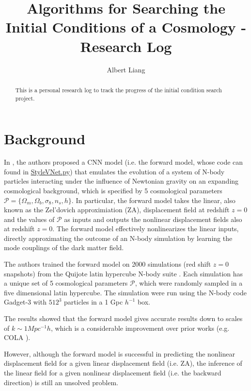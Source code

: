\documentclass{article}
\title{Algorithms for Searching the Initial Conditions of a Cosmology - Research Log}
\author{%
  Albert Liang
}
\begin{document}
\maketitle


\begin{abstract}
    This is a personal research log to track the progress of the initial condition search project.
\end{abstract}

\section{Background}

In \cite{emulator}, the authors proposed a CNN model (i.e. the forward model, whose code can found in \href{https://github.com/thisisalbertliang/map2map/blob/search/map2map/models/styled_vnet.py#L8}{StyleVNet.py}) that emulates the evolution of a system of N-body particles interacting under the influence of Newtonian gravity on an expanding cosmological background, which is specified by 5 cosmological parameters $\mathcal{P} = \{ \Omega_m, \Omega_b, \sigma_8, n_s, h \}$. In particular, the forward model takes the linear, also known as the Zel'dovich approximiation (ZA), displacement field at redshift $z = 0$ and the values of $\mathcal{P}$ as inputs and outputs the nonlinear displacement fields also at redshift $z = 0$. The forward model effectively nonlinearizes the linear inputs, directly approximating the outcome of an N-body simulation by learning the mode couplings of the dark matter field.

The authors trained the forward model on 2000 simulations (red shift $z = 0$ snapshots) from the Quijote latin hypercube N-body suite \cite{quijote}. Each simulation has a unique set of 5 cosmological parameters $\mathcal{P}$, which were randomly sampled in a five dimensional latin hypercube. The simulation were run using the N-body code Gadget-3 \cite{gadget-3} with $512^3$ particles in a 1 Gpc $h^{-1}$ box.

The results showed that the forward model gives accurate results down to scales of $k \sim 1 Mpc^{-1} h$, which is a considerable improvement over prior works (e.g. COLA \cite{cola}).

However, although the forward model is successful in predicting the nonlinear displacement field for a given linear displacement field (i.e. ZA), the inference of the linear field for a given nonlinear displacement field (i.e. the backward direction) is still an unsolved problem.
\end{document}
